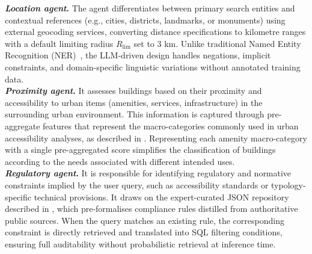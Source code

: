 \documentclass[runningheads,orivec]{llncs}
\newcommand{\locationagent}{\textit{Location agent}}
\newcommand{\proximityagent}{\textit{Proximity agent}}
\newcommand{\regulatoryagent}{\textit{Regulatory agent}}
\begin{document}
\textbf{\locationagent.} 
The agent differentiates between primary search entities and contextual references (e.g., cities, districts, landmarks, or monuments) using external geocoding services, 
converting distance specifications to kilometre ranges with a default limiting radius $R_\text{lim}$ set to 3 km. 
Unlike traditional Named Entity Recognition (NER)~\cite{Jehangir2023SurveyNER}, the LLM-driven design handles negations, implicit constraints, and domain-specific linguistic variations without annotated training data.\\
\textbf{\proximityagent.}  
It assesses buildings based on their proximity and accessibility to urban items (amenities, services, infrastructure) in the surrounding urban environment. This information is captured through pre-aggregate features that represent the macro-categories commonly used in urban accessibility analyses, as described in .
Representing each amenity macro-category with a single pre-aggregated score simplifies the classification of buildings according to the needs associated with different intended uses.
\\
\textbf{\regulatoryagent.} 
It is responsible for identifying regulatory and normative constraints implied by the user query, such as accessibility standards or typology-specific technical provisions. It draws on the expert-curated JSON repository described in , which pre-formalises compliance rules distilled from authoritative public sources.
When the query matches an existing rule, the corresponding constraint is directly retrieved and translated into SQL filtering conditions, ensuring full auditability without probabilistic retrieval at inference time.
\end{document}
